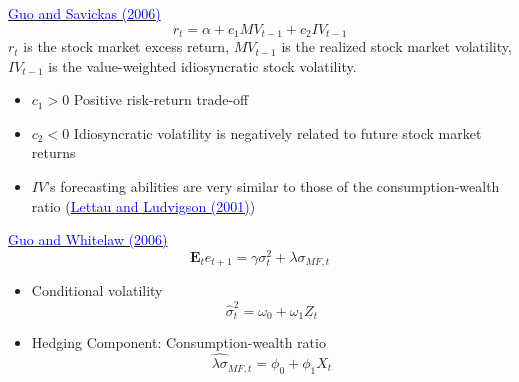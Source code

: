 \documentclass{beamer}
\begin{document}
\begin{frame}{\href{https://www.jstor.org/stable/27638851}{\textcolor{blue}{Guo and Savickas (2006)}}}
	\begin{equation}
		r_t = \alpha + c_1 MV_{t-1} + c_2 IV_{t-1}
	\end{equation}
	$ r_t $ is the stock market excess return, $ MV_{t-1} $ is the realized stock market volatility, $ IV_{t-1} $ is the value-weighted idiosyncratic stock volatility.
	\begin{itemize}
		\item $ c_1 > 0 $ Positive risk-return trade-off
		\item  $ c_2 < 0 $ Idiosyncratic volatility is negatively related to future stock market returns
		\item $ IV $'s forecasting abilities are very similar to those of the
		consumption-wealth ratio (\href{https://www.jstor.org/stable/222534}{\textcolor{blue}{Lettau and Ludvigson (2001)}})
	\end{itemize}
\end{frame}

\begin{frame}{\href{https://doi.org/10.1111/j.1540-6261.2006.00877.x}{\textcolor{blue}{Guo and Whitelaw (2006)}}}
	\begin{equation}
		\mathbf{E}_{t} e_{t+1}=\gamma \sigma_{t}^{2}+\lambda \sigma_{M F, t}
	\end{equation}
\begin{itemize}
	\item Conditional volatility
	\begin{equation}
		\hat{\sigma}_{t}^{2}=\omega_{0}+\omega_{1} Z_{t}
	\end{equation}
	\item Hedging Component: Consumption-wealth ratio
	\begin{equation}
		\widehat{\lambda \sigma}_{M F, t}=\phi_{0}+\phi_{1} X_{t}
	\end{equation}
\end{itemize}
\end{frame}
\end{document}
